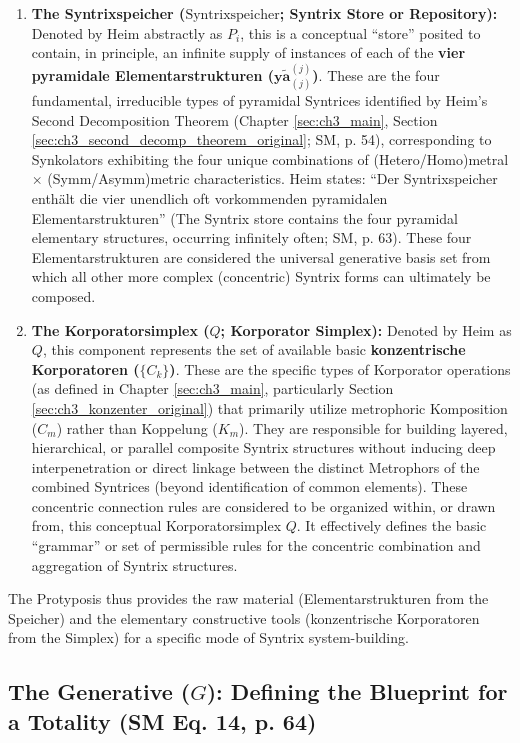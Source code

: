 \documentclass[
    12pt,              %
    a4paper,           %
    headings=normal,   %
    twoside=true,      %
    BCOR=8mm,          %
]{scrbook}
\newcommand{\q}[1]{\enquote{#1}}
\newcommand{\elementarstruktur}{\bm{y\widetilde{a}}_{(j)}}
\newcommand{\generative}{G}
\newcommand{\syntrixspeicher}{\text{Syntrixspeicher}}
\newcommand{\korporatorsimplex}{Q}
\begin{document}
\begin{enumerate}[label=(\alph*)]
    \item  \textbf{The Syntrixspeicher (\(\syntrixspeicher\); Syntrix Store or Repository):}
        Denoted by Heim abstractly as \(P_i\), this is a conceptual \q{store} posited to contain, in principle, an infinite supply of instances of each of the \textbf{vier pyramidale Elementarstrukturen (\(\elementarstruktur^{(j)}\))}. These are the four fundamental, irreducible types of pyramidal Syntrices identified by Heim's Second Decomposition Theorem (Chapter \ref{sec:ch3_main}, Section \ref{sec:ch3_second_decomp_theorem_original}; SM, p. 54), corresponding to Synkolators exhibiting the four unique combinations of (Hetero/Homo)metral \(\times\) (Symm/Asymm)metric characteristics. Heim states: \q{Der Syntrixspeicher enthält die vier unendlich oft vorkommenden pyramidalen Elementarstrukturen} (The Syntrix store contains the four pyramidal elementary structures, occurring infinitely often; SM, p. 63). These four Elementarstrukturen are considered the universal generative basis set from which all other more complex (concentric) Syntrix forms can ultimately be composed.

    \item  \textbf{The Korporatorsimplex (\(\korporatorsimplex\); Korporator Simplex):}
        Denoted by Heim as \(Q\), this component represents the set of available basic \textbf{konzentrische Korporatoren (\(\{C_k\}\))}. These are the specific types of Korporator operations (as defined in Chapter \ref{sec:ch3_main}, particularly Section \ref{sec:ch3_konzenter_original}) that primarily utilize metrophoric Komposition (\(C_m\)) rather than Koppelung (\(K_m\)). They are responsible for building layered, hierarchical, or parallel composite Syntrix structures without inducing deep interpenetration or direct linkage between the distinct Metrophors of the combined Syntrices (beyond identification of common elements). These concentric connection rules are considered to be organized within, or drawn from, this conceptual Korporatorsimplex \(Q\). It effectively defines the basic \q{grammar} or set of permissible rules for the concentric combination and aggregation of Syntrix structures.
\end{enumerate}
The Protyposis thus provides the raw material (Elementarstrukturen from the Speicher) and the elementary constructive tools (konzentrische Korporatoren from the Simplex) for a specific mode of Syntrix system-building.

\subsection{The Generative (\(\generative\)): Defining the Blueprint for a Totality (SM Eq. 14, p. 64)}
\label{sec:ch4_generative_g_revised} 
\end{document}
